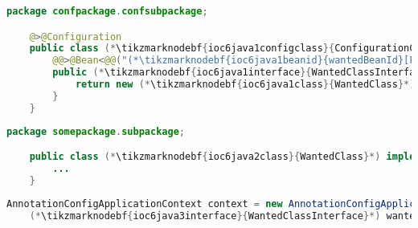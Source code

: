 \begin{lstlisting}[language=Java, title={Configuration class}]
    package confpackage.confsubpackage;

    @>@Configuration
    public class (*\tikzmarknodebf{ioc6java1configclass}{ConfigurationClass}*) {
        @@>@Bean<@@("(*\tikzmarknodebf{ioc6java1beanid}{wantedBeanId}[ForestGreen]*)")
        public (*\tikzmarknodebf{ioc6java1interface}{WantedClassInterface}*) wantedBeanMethod() {
            return new (*\tikzmarknodebf{ioc6java1class}{WantedClass}*)();
        }
    }
\end{lstlisting}
\begin{lstlisting}[language=Java, title={Wanted class}]
    package somepackage.subpackage;

    public class (*\tikzmarknodebf{ioc6java2class}{WantedClass}*) implements (*\tikzmarknodebf{ioc6java2interface}{WantedClassInterface}*) {
        ...
    }
\end{lstlisting}
\begin{lstlisting}[language=Java, title={Usage}]
    AnnotationConfigApplicationContext context = new AnnotationConfigApplicationContext((*\tikzmarknodebf{ioc6java3configclass}{ConfigurationClass}*).class);
    (*\tikzmarknodebf{ioc6java3interface}{WantedClassInterface}*) wantedClassInstance = context.getBean("(*\tikzmarknodebf{ioc6java3beanid}{wantedBeanId}[ForestGreen]*)", (*\tikzmarknodebf{ioc6java3interface2}{WantedClassInterface}*).class);
\end{lstlisting}
\newpage

